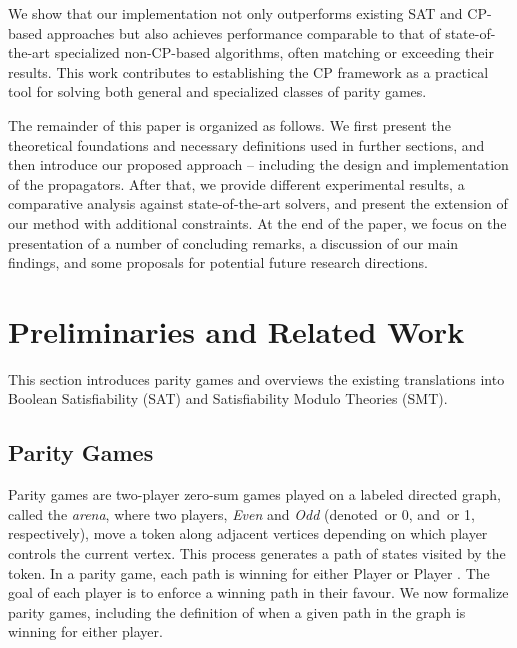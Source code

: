 \documentclass[runningheads]{llncs}
\begin{document}
We show that our implementation not only outperforms existing SAT and CP-based approaches but also achieves performance comparable to that of state-of-the-art specialized non-CP-based algorithms, often matching or exceeding their results. This work contributes to establishing the CP framework as a practical tool for solving both general and specialized classes of parity games.

The remainder of this paper is organized as follows. We first present the theoretical foundations and necessary definitions used in further sections, and then introduce our proposed approach -- including the design and implementation of the \noc propagators. After that, we provide different experimental results, a comparative analysis against state-of-the-art solvers, and present the extension of our method with additional constraints. At the end of the paper, we focus on the presentation of a number of concluding remarks, a discussion of our main findings, and some proposals for potential future research directions.

\section{Preliminaries and Related Work}

This section introduces parity games and overviews the existing translations into Boolean Satisfiability (SAT) and Satisfiability Modulo Theories (SMT).

\subsection{Parity Games}

Parity games are two-player zero-sum games played on a labeled directed graph, called the \textit{arena}, where two players, \textit{Even} and \textit{Odd} (denoted~\even or 0, and~\odd or 1, respectively), move a token along adjacent vertices depending on which player controls the current vertex. This process generates a path of states visited by the token. In a parity game, each path is winning for either Player \even or Player \odd. The goal of each player is to enforce a winning path in their favour. We now formalize parity games, including the definition of when a given path in the graph is winning for either player.
\end{document}
